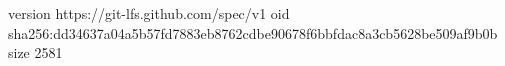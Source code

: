 version https://git-lfs.github.com/spec/v1
oid sha256:dd34637a04a5b57fd7883eb8762cdbe90678f6bbfdac8a3cb5628be509af9b0b
size 2581
